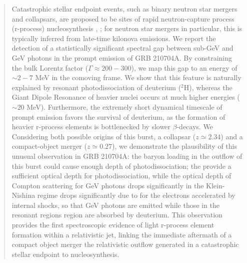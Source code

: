 \documentclass[linenumbers,twocolumn]{aastex631}
\providecommand{\DIFaddtex}[1]{{\protect\color{blue} \sf #1}} %
\providecommand{\DIFdeltex}[1]{{\protect\color{red} \scriptsize #1}} %
\providecommand{\DIFaddbegin}{} %
\providecommand{\DIFaddend}{} %
\providecommand{\DIFdelbegin}{} %
\providecommand{\DIFdelend}{} %
\providecommand{\DIFadd}[1]{\texorpdfstring{\DIFaddtex{#1}}{#1}} %
\providecommand{\DIFdel}[1]{\texorpdfstring{\DIFdeltex{#1}}{}} %
\begin{document}
\begin{abstract}
\DIFadd{Catastrophic stellar endpoint events, such as binary neutron star mergers and collapsars, are proposed to be }\DIFaddend sites of rapid neutron-capture process (r-process) nucleosynthesis\DIFdelbegin \DIFdel{, }\DIFdelend \DIFaddbegin \DIFadd{; for neutron star mergers in particular, this is }\DIFaddend typically inferred from late-time kilonova emissions. We report the detection of a statistically significant spectral gap between sub-GeV and GeV photons in the prompt emission of GRB 210704A. By constraining the bulk Lorentz factor\DIFdelbegin \DIFdel{($\Gamma \approx 200-300$)}\DIFdelend , we map this gap to an energy of $\sim 2-7$ MeV in the comoving frame. We show that this feature is naturally explained by resonant photodissociation of deuterium ($^2$H), whereas the Giant Dipole Resonance of heavier nuclei occurs at much higher energies ($\sim 20$ MeV). Furthermore, the extremely short dynamical timescale of prompt emission favors the survival of deuterium, as the formation of heavier r-process elements is bottlenecked by slower $\beta$-decays. \DIFdelbegin \DIFdel{We }\DIFdelend \DIFaddbegin \DIFadd{Considering both possible origins of this burst, a collapsar ($z\simeq2.34$) and a compact-object merger ($z\simeq0.27$), we }\DIFaddend demonstrate the plausibility of this unusual observation in GRB 210704A: the baryon loading in the outflow of this burst could \DIFdelbegin \DIFdel{cause enough depth of photodissociation; the }\DIFdelend \DIFaddbegin \DIFadd{provide a sufficient optical depth for photodissociation, while the optical }\DIFaddend depth of Compton scattering for GeV photons \DIFaddbegin \DIFadd{drops significantly }\DIFaddend in the Klein-Nishina regime \DIFdelbegin \DIFdel{drops significantly due to }\DIFdelend \DIFaddbegin \DIFadd{for }\DIFaddend the electrons accelerated by internal shocks, so that GeV photons are emitted while those in the resonant \DIFdelbegin \DIFdel{regions }\DIFdelend \DIFaddbegin \DIFadd{region }\DIFaddend are absorbed by deuterium. This observation provides the first spectroscopic evidence of light r-process element formation within a relativistic jet, linking the immediate aftermath of \DIFdelbegin \DIFdel{a compact object merger }\DIFdelend \DIFaddbegin \DIFadd{the relativistic outflow generated in a catastrophic stellar endpoint }\DIFaddend to nucleosynthesis.



\end{abstract}
\end{document}

